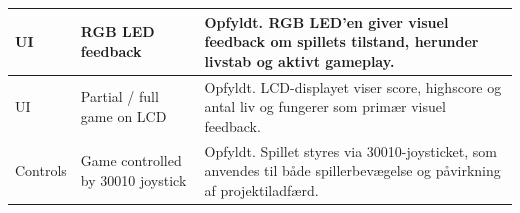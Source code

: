 \begin{tabular}{|p{2.4cm}|p{3.6cm}|p{7.4cm}|}
UI &
RGB LED feedback &
Opfyldt. RGB LED’en giver visuel feedback om spillets tilstand, herunder livstab og aktivt gameplay. \\
\hline

UI &
Partial / full game on LCD &
Opfyldt. LCD-displayet viser score, highscore og antal liv og fungerer som primær visuel feedback. \\
\hline

Controls &
Game controlled by 30010 joystick &
Opfyldt. Spillet styres via 30010-joysticket, som anvendes til både spillerbevægelse og påvirkning af projektiladfærd. \\
\hline

\end{tabular}

